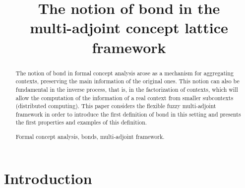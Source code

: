 \documentclass[runningheads,a4paper]{llncs}
\newcommand{\keywords}[1]{\par\addvspace\baselineskip
\noindent\keywordname\enspace\ignorespaces#1}
\begin{document}
	
\mainmatter  %

%
%
\title{The notion of bond in the\\ multi-adjoint concept lattice framework}
\titlerunning{}
%
\author{}
\institute{}
%
%
%
\maketitle              %
% 
\begin{abstract}

The notion of bond in formal concept analysis arose as a mechanism for aggregating contexts, preserving the main information of the original ones. 
This notion can also be fundamental in the inverse process, that is, in the factorization of contexts, which will allow the computation of the information of a real context from smaller subcontexts (distributed computing). 
This paper considers the flexible fuzzy multi-adjoint framework in order to introduce the first definition of bond in this setting and presents the first properties and examples of this definition. 
	
\keywords{Formal concept analysis, bonds, multi-adjoint framework.}
\end{abstract}

\section{Introduction}
\end{document}
